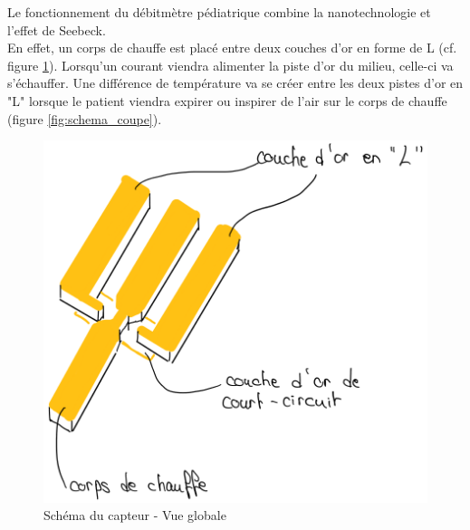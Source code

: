 Le fonctionnement du débitmètre pédiatrique combine la nanotechnologie et l'effet de Seebeck. \\
En effet, un corps de chauffe est placé entre deux couches d'or en forme de L (cf. figure \ref{fig:schema_global}). Lorsqu'un courant viendra 
alimenter la piste d'or du milieu, celle-ci va s'échauffer. Une différence de température va se créer entre les deux pistes d'or en "L" lorsque 
le patient viendra expirer ou inspirer de l'air sur le corps de chauffe (figure \ref{fig:schema_coupe}). 
\begin{figure}[H]
    \centering
    \includegraphics[scale = 0.4]{assets/figures/schema_capteur_vue_generale.png}
    \caption{Schéma du capteur - Vue globale}
    \label{fig:schema_global}
\end{figure}
